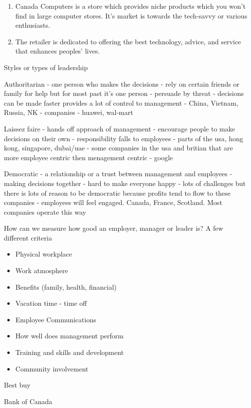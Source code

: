 \documentclass[11pt]{article}
\begin{document}
\begin{enumerate}
    \item Canada Computers is a store which provides niche products which you won't find in large computer stores. It's market is towards the tech-savvy or various enthusiasts.    
    \item The retailer is dedicated to offering the best technology, advice, and service that enhances peoples’ lives.
\end{enumerate}


Styles or types of leadership

Authoritarian - one person who makes the decisions - rely on certain friends or family for help but for most past it's one person - persuade by threat - decisions can be made faster provides a lot of control to management - China, Vietnam, Russia, NK - companies - huawei, wal-mart

Laissez faire - hands off approach of management - encourage people to make decisions on their own - responsibility falls to employees - parts of the usa, hong kong, singapore, dubai/uae - some companies in the usa and britian that are more employee centric then menagement centric - google 

Democratic - a relationship or a trust between management and employees - making decisions together - hard to make everyone happy - lots of challenges but there is lots of reason to be democratic because profits tend to flow to these companies - employees will feel engaged. Canada, France, Scotland. Most companies operate this way

How can we measure how good an employer, manager or leader is? A few different criteria

\begin{itemize}
    \item Physical workplace
    \item Work atmosphere
    \item Benefits (family, health, financial)
    \item Vacation time - time off
    \item Employee Communications
    \item How well does management perform
    \item Training and skills and development
    \item Community involvement
\end{itemize}

Best buy

Bank of Canada
\end{document}
